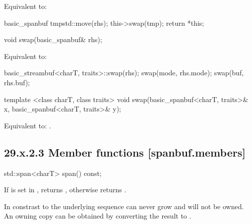 \documentclass[ebook,11pt,article]{memoir}
\begin{document}
\begin{itemdescr}
\pnum
\effects Equivalent to:
\begin{codeblock}
    basic_spanbuf tmp{std::move(rhs)};
    this->swap(tmp);
    return *this;
\end{codeblock}
\end{itemdescr}

\begin{itemdecl}
void swap(basic_spanbuf& rhs);
\end{itemdecl}

\begin{itemdescr}
\pnum
\effects Equivalent to:
\begin{codeblock} 
    basic_streambuf<charT, traits>::swap(rhs);
    swap(mode, rhs.mode);
    swap(buf, rhs.buf);
\end{codeblock}
\end{itemdescr}

\begin{itemdecl}
template <class charT, class traits>
  void swap(basic_spanbuf<charT, traits>& x,
            basic_spanbuf<charT, traits>& y);
\end{itemdecl}

\begin{itemdescr}
\pnum
\effects Equivalent to: .
\end{itemdescr}


\subsection{29.x.2.3 Member functions [spanbuf.members]}

\begin{itemdecl}
std::span<charT> span() const;
\end{itemdecl}

\begin{itemdescr}
\pnum
\returns
If  is set in ,
returns , 
otherwise returns . 

\begin{note}
In constrast to  the underlying sequence can never grow and will not be owned. An owning copy can be obtained by converting the result to .
\end{note}


\end{itemdescr}
\end{document}
